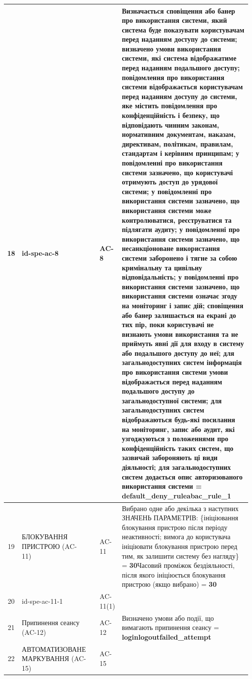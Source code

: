 \documentclass[10pt]{article}
\begin{document}
\begin{longtable}{|c|>{\raggedright\arraybackslash}p{2.5cm}|>{\raggedright\arraybackslash}p{4.5cm}|>{\raggedright\arraybackslash}p{3cm}|>{\raggedright\arraybackslash}p{4.5cm}|}
18 & id-spe-ac-8 &  & AC-8 & Визначається сповіщення або банер про використання системи, який система буде показувати користувачам перед наданням доступу до системи; визначено умови використання системи, які система відображатиме перед наданням подальшого доступу; повідомлення про використання системи відображається користувачам перед наданням доступу до системи, яке містить повідомлення про конфіденційність і безпеку, що відповідають чинним законам, нормативним документам, наказам, директивам, політикам, правилам, стандартам і керівним принципам; у повідомленні про використання системи зазначено, що користувачі отримують доступ до урядової системи; у повідомленні про використання системи зазначено, що використання системи може контролюватися, реєструватися та підлягати аудиту; у повідомленні про використання системи зазначено, що несанкціоноване використання системи заборонено і тягне за собою кримінальну та цивільну відповідальність; у повідомленні про використання системи зазначено, що використання системи означає згоду на моніторинг і запис дій; сповіщення або банер залишається на екрані до тих пір, поки користувачі не визнають умови використання та не приймуть явні дії для входу в систему або подальшого доступу до неї; для загальнодоступних систем інформація про використання системи умови відображається перед наданням подальшого доступу до загальнодоступної системи; для загальнодоступних систем відображаються будь-які посилання на моніторинг, запис або аудит, які узгоджуються з положеннями про конфіденційність таких систем, що зазвичай забороняють ці види діяльності; для загальнодоступних систем додається опис авторизованого використання системи = \textbf{default\_\allowbreak{}deny\_\allowbreak{}ruleabac\_\allowbreak{}rule\_\allowbreak{}1} \\ \hline
19 & БЛОКУВАННЯ ПРИСТРОЮ (AC-11) &  & AC-11 & Вибрано одне або декілька з наступних ЗНАЧЕНЬ ПАРАМЕТРІВ: \{ініціювання блокування пристрою після періоду неактивності; вимога до користувача ініціювати блокування пристрою перед тим, як залишити систему без нагляду\} = \textbf{30}\newline Часовий проміжок бездіяльності, після якого ініціюється блокування пристрою (якщо вибрано) = \textbf{30} \\ \hline
20 & id-spe-ac-11-1 &  & AC-11(1) &  \\ \hline
21 & Припинення сеансу (AC-12) &  & AC-12 & Визначено умови або події, що вимагають припинення сеансу = \textbf{loginlogoutfailed\_\allowbreak{}attempt} \\ \hline
22 & АВТОМАТИЗОВАНЕ МАРКУВАННЯ (AC-15) &  & AC-15 &  \\ \hline

\end{longtable}
\end{document}

